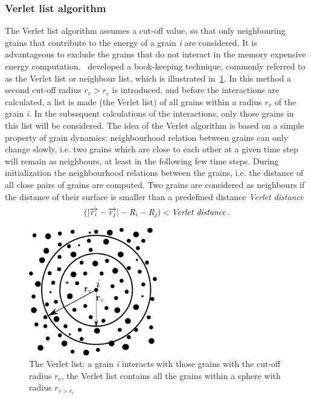 \subsubsection{Verlet list algorithm}
The Verlet list algorithm assumes a cut-off value, so that only neighbouring 
grains that contribute to the energy of a grain \textit{i} are considered. It 
is advantageous to exclude the grains that do not interact in the memory 
expensive energy computation.~\citet{Verlet1967} developed a book-keeping 
technique, commonly referred to as the Verlet list or neighbour list, which is 
illustrated in~\ref{fig:Verletb}. In this method a second cut-off radius 
$r_{\mathit{v}}>r_{c}$ is introduced, and before the interactions are 
calculated, a list is made (the Verlet list) of all grains within a radius 
$r_{\mathit{v}}$ of the grain \textit{i}. In the subsequent calculations of the 
interactions, only those grains in this list will be considered. The idea of 
the Verlet algorithm is based on a simple property of grain dynamics: 
neighbourhood relation between grains can only change slowly, i.e. two grains 
which are close to each other at a given time step will remain as neighbours, 
at least in the following few time steps. During initialization the 
neighbourhood relations between the grains, i.e. the distance of all close 
pairs of grains are computed. Two grains are considered as neighbours if 
the distance of their surface is smaller than a predefined distance 
\textit{Verlet distance}
%
\begin{equation}
(\left|\overrightarrow{r_{\mathit{i}}}-\overrightarrow{r_{\mathit{j}}}\right|
-\mathit{R}_{\mathit{i}}-\mathit{R}_{\mathit{j}})<\mbox{\textit{Verlet
 distance}} \,.
\end{equation}

\begin{figure}[tbhp]	
\centering
\includegraphics[width=0.5\textwidth]{Verletb}
\caption[Verlet list]{The Verlet list: a grain \textit{i} interacts with 
those grains with 
the cut-off radius $r_{c}$, the Verlet list contains all the grains within 
a sphere with radius 
$r_{\mathit{v}>r_{c}}$}
\label{fig:Verletb}
\end{figure}

